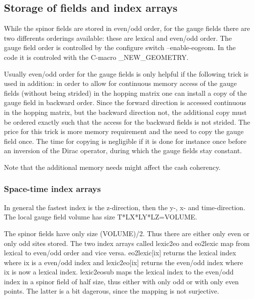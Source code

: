 \subsection{Storage of fields and index arrays}

While the spinor fields are stored in even/odd order, for the gauge
fields there are two differents orderings available: these are
lexical and even/odd order. The gauge field order is controlled
by the configure switch {\ttfamily --enable-eogeom}. In the code it is
controled with the C-macro {\ttfamily \_NEW\_GEOMETRY}.

Usually even/odd order for the gauge fields is only helpful if the
following trick is used in addition: in order to allow for continuous
memory access of the gauge fields (without being strided) in the
hopping matrix one can install a copy of the gauge field in backward
order. Since the forward direction is accessed continuous in the
hopping matrix, but the backward direction not, the additional copy
must be ordered exactly such that the access for the backward fields
is not strided. The price for this trick is more memory requirement
and the need to copy the gauge field once. The time for copying is
negligible if it is done for instance once before an inversion of the
Dirac operator, during which the gauge fields stay constant.

Note that the additional memory needs might affect the cash coherency.

\subsubsection{Space-time index arrays}

In general the fastest index is the z-direction, then the y-, x- and
time-direction. The local gauge field volume has size
{\ttfamily T*LX*LY*LZ=VOLUME}. 

The spinor fields have only size {\ttfamily (VOLUME)/2}. Thus
there are either only even or only odd sites stored. The two
index arrays called {\ttfamily lexic2eo} and {\ttfamily eo2lexic} map
from lexical to even/odd order and vice versa. {\ttfamily
  eo2lexic[ix]} returns the lexical index where {\ttfamily ix} is a
even/odd index and {\ttfamily lexic2eo[ix]} returns the even/odd index
where {\ttfamily ix} is now a lexical index. {\ttfamily lexic2eosub}
maps the lexical index to the even/odd index in a spinor field of half
size, thus either with only odd or with only even points. The latter
is a bit dagerous, since the mapping is not surjective.

